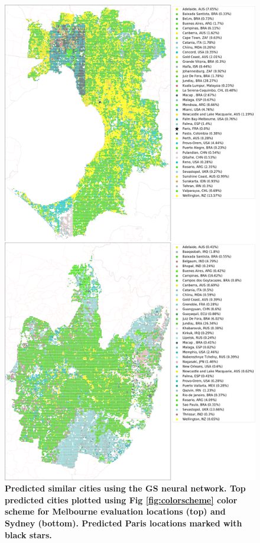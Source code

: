 \documentclass[10pt,letterpaper]{article}
\begin{document}
\begin{figure}[!htbp]
\centering    
\includegraphics[scale=0.16]{Images/PlosOne/Fig8.png} 
\caption{\bf Predicted similar cities using the GS neural network. Top predicted cities plotted using Fig \ref{fig:colorscheme} color scheme for Melbourne evaluation locations (top) and Sydney (bottom). Predicted Paris locations marked with black stars.} 
 \label{fig:melsat}  
\end{figure} 
\end{document}
